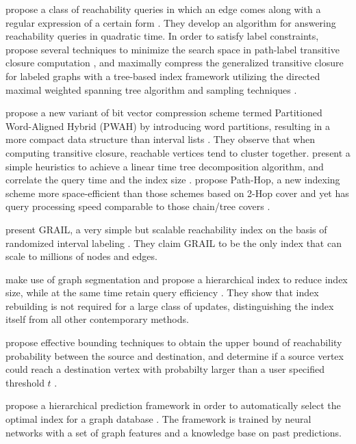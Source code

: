 \documentclass[12pt,conference,compsocconf]{../IEEEtran}
\begin{document}
 propose a class of reachability queries in which an edge comes along with a regular expression of a certain form \citep{1052}. They develop an algorithm for answering reachability queries in quadratic time. In order to satisfy label constraints,  propose several techniques to minimize the search space in path-label transitive closure computation \citep{1055}, and  maximally compress the generalized transitive closure for labeled graphs with a tree-based index framework utilizing the directed maximal weighted spanning tree algorithm and sampling techniques \citep{1057}.

 propose a new variant of bit vector compression scheme termed Partitioned Word-Aligned Hybrid (PWAH) by introducing word partitions, resulting in a more compact data structure than interval lists \citep{1054}. They observe that when computing transitive closure, reachable vertices tend to cluster together.  present a simple heuristics to achieve a linear time tree decomposition algorithm, and correlate the query time and the index size \citep{1058}.  propose Path-Hop, a new indexing scheme more space-efficient than those schemes based on 2-Hop cover and yet has query processing speed comparable to those chain/tree covers \citep{1060}.

 present GRAIL, a very simple but scalable reachability index on the basis of randomized interval labeling \citep{1059}. They claim GRAIL to be the only index that can scale to millions of nodes and edges.

 make use of graph segmentation and propose a hierarchical index to reduce index size, while at the same time retain query efficiency \citep{1053}. They show that index rebuilding is not required for a large class of updates, distinguishing the index itself from all other contemporary methods.

 propose effective bounding techniques to obtain the upper bound of reachability probability between the source and destination, and determine if a source vertex could reach a destination vertex with probabilty larger than a user specified threshold $t$ \citep{1056}.

 propose a hierarchical prediction framework in order to automatically select the optimal index for a graph database \citep{1061}. The framework is trained by neural networks with a set of graph features and a knowledge base on past predictions.
\end{document}
